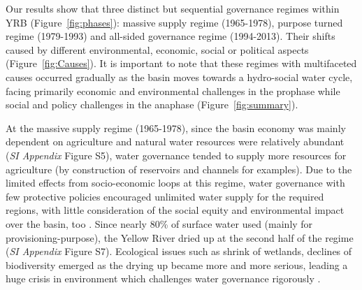 \documentclass[9pt, twocolumn, twoside, lineno]{pnas-new}
\begin{document}
Our results show that three distinct but sequential governance regimes within YRB (Figure~\ref{fig:phases}): massive supply regime (1965-1978), purpose turned regime (1979-1993) and all-sided governance regime (1994-2013). Their shifts caused by different environmental, economic, social or political aspects (Figure~\ref{fig:Causes}).
It is important to note that these regimes with multifaceted causes occurred gradually as the basin moves towards a hydro-social water cycle, facing primarily economic and environmental challenges in the prophase while social and policy challenges in the anaphase (Figure~\ref{fig:summary}).

At the massive supply regime (1965-1978), since the basin economy was mainly dependent on agriculture and natural water resources were relatively abundant (\textit{SI Appendix} Figure S5), water governance tended to supply more resources for agriculture (by construction of reservoirs and channels for examples). 
Due to the limited effects from socio-economic loops at this regime, water governance with few protective policies encouraged unlimited water supply for the required regions, with little consideration of the social equity and environmental impact over the basin, too 
\cite{zhou2020}. 
Since nearly 80\% of surface water used (mainly for provisioning-purpose), the Yellow River dried up at the second half of the regime (\textit{SI Appendix} Figure S7). 
Ecological issues such as shrink of wetlands, declines of biodiversity emerged as the drying up became more and more serious, leading a huge crisis in environment which challenges water governance rigorously 
\cite{wohlfart2016}.
\end{document}
